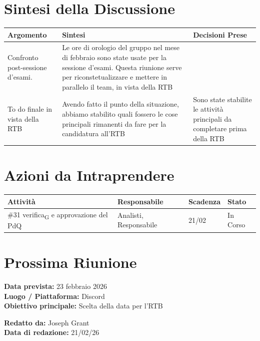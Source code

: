 \documentclass[a4paper,12pt]{article}
\newcommand{\gls}[1]{#1\textsubscript{G}}
\begin{document}
\section*{ Sintesi della Discussione}

\begin{longtable}{|p{}|p{}|p{}|}
\hline
\textbf{Argomento} & \textbf{Sintesi} & \textbf{Decisioni Prese} \\ \hline
Confronto post-sessione d'esami. & Le ore di orologio del gruppo nel mese di febbraio sono state usate per la sessione d'esami. Questa riunione serve per riconstetualizzare e mettere in parallelo il team, in vista della RTB & \\ \hline
To do finale in vista della RTB & Avendo fatto il punto della situazione, abbiamo stabilito quali fossero le cose principali rimanenti da fare per la candidatura all'RTB & Sono state stabilite le attività principali da completare prima della RTB \\ \hline
\end{longtable}

\section*{ Azioni da Intraprendere}

\begin{longtable}{|p{}|p{}|p{}|p{}|}
\hline
\textbf{Attività} & \textbf{Responsabile} & \textbf{Scadenza} & \textbf{Stato} \\ \hline
\#31 \gls{verifica} e approvazione del PdQ & Analisti, Responsabile  & 21/02  &In Corso  \\ \hline


\end{longtable}


\section*{ Prossima Riunione}
\textbf{Data prevista:} 23 febbraio 2026 \\
\textbf{Luogo / Piattaforma:} Discord \\
\textbf{Obiettivo principale:} Scelta della data per l'RTB


\textbf{Redatto da:} Joseph Grant \\
\textbf{Data di redazione:} 21/02/26
\end{document}
